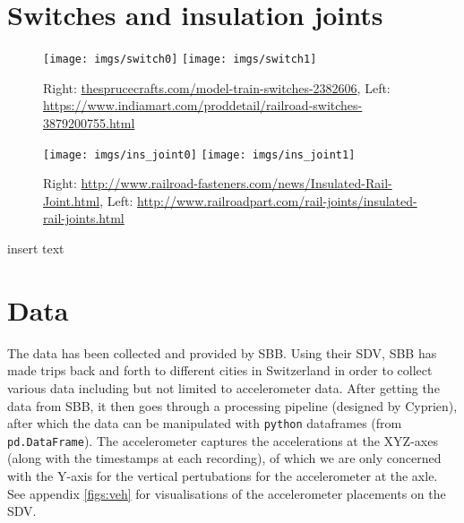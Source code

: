 \section{Switches and insulation joints}

\begin{figure}[H]
	\centering
	\texttt{[image: imgs/switch0]}
	\label{fig:veh0}
	\texttt{[image: imgs/switch1]}
	\label{fig:veh1}
	\caption{Right: \url{thesprucecrafts.com/model-train-switches-2382606}, 
	Left: 	\url{https://www.indiamart.com/proddetail/railroad-switches-3879200755.html}}
	\label{fig:veh2}
\end{figure}
\begin{figure}[H]
	\centering
	\texttt{[image: imgs/ins\_joint0]}
	\label{fig:veh0}
	\texttt{[image: imgs/ins\_joint1]}
	\label{fig:veh1}
	\caption{Right: \url{http://www.railroad-fasteners.com/news/Insulated-Rail-Joint.html}, Left: \url{http://www.railroadpart.com/rail-joints/insulated-rail-joints.html}}
	\label{fig:veh2}
\end{figure}

insert text \todo{}
\section{Data}
The data has been collected and provided by SBB. Using their SDV, SBB has made trips back and forth to different cities in Switzerland in order to collect various data including but not limited to accelerometer data. After getting the data from SBB, it then goes through a processing pipeline (designed by Cyprien), after which the data can be manipulated with \verb|python| dataframes (from \verb|pd.DataFrame|). The accelerometer captures the accelerations at the XYZ-axes (along with the timestamps at each recording), of which we are only concerned with the Y-axis for the vertical pertubations for the accelerometer at the axle. See appendix \ref{figs:veh} for visualisations of the accelerometer placements on the SDV. 

